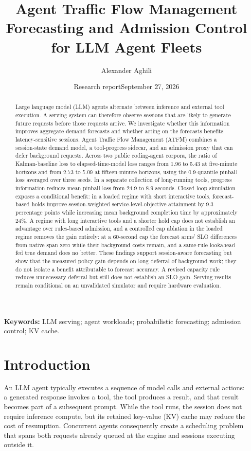 \documentclass[11pt,a4paper]{article}
\title{\textbf{Agent Traffic Flow Management}\\[5pt]\large Forecasting and Admission Control for LLM Agent Fleets}
\author{Alexander Aghili}
\date{Research report\enspace\textperiodcentered\enspace September 27, 2026}
\begin{document}
\maketitle

\begin{abstract}
Large language model (LLM) agents alternate between inference and external tool execution. A serving system can therefore observe sessions that are likely to generate future requests before those requests arrive. We investigate whether this information improves aggregate demand forecasts and whether acting on the forecasts benefits latency-sensitive sessions. Agent Traffic Flow Management (ATFM) combines a session-state demand model, a tool-progress sidecar, and an admission proxy that can defer background requests. Across two public coding-agent corpora, the ratio of Kalman-baseline loss to elapsed-time-model loss ranges from 1.96 to 5.43 at five-minute horizons and from 2.73 to 5.09 at fifteen-minute horizons, using the 0.9-quantile pinball loss averaged over three seeds. In a separate collection of long-running tools, progress information reduces mean pinball loss from 24.9 to 8.9 seconds. Closed-loop simulation exposes a conditional benefit: in a loaded regime with short interactive tools, forecast-based holds improve session-weighted service-level-objective attainment by 9.3 percentage points while increasing mean background completion time by approximately 24\%. A regime with long interactive tools and a shorter hold cap does not establish an advantage over rules-based admission, and a controlled cap ablation in the loaded regime removes the gain entirely: at a 60-second cap the forecast arms' SLO differences from native span zero while their background costs remain, and a same-rule lookahead fed true demand does no better. These findings support session-aware forecasting but show that the measured policy gain depends on long deferral of background work; they do not isolate a benefit attributable to forecast accuracy. A revised capacity rule reduces unnecessary deferral but still does not establish an SLO gain. Serving results remain conditional on an unvalidated simulator and require hardware evaluation.


\end{abstract}
\textbf{Keywords:} LLM serving; agent workloads; probabilistic forecasting; admission control; KV cache.


\section{Introduction}
\label{sec:1}
An LLM agent typically executes a sequence of model calls and external actions: a generated response invokes a tool, the tool produces a result, and that result becomes part of a subsequent prompt. While the tool runs, the session does not require inference compute, but its retained key-value (KV) cache may reduce the cost of resumption. Concurrent agents consequently create a scheduling problem that spans both requests already queued at the engine and sessions executing outside it.
\end{document}
